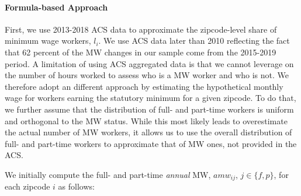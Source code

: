 
\paragraph{Formula-based Approach}
First, we use 2013-2018 ACS data to approximate the zipcode-level share of minimum wage 
workers, $l_{i}$. We use ACS data later than 2010 reflecting the fact that 62 percent of the 
MW changes in our sample come from the 2015-2019 period. A limitation of using ACS 
aggregated data is that we cannot leverage on the number of hours worked to assess who is a 
MW worker and who is not. We therefore adopt an different approach by estimating the hypothetical 
monthly wage for workers earning the statutory minimum for a given zipcode. To do that, 
we further assume that the distribution of full- and part-time workers is uniform and orthogonal 
to the MW status. While this most likely leads to overestimate the actual number of MW workers, 
it allows us to use the overall distribution of full- and part-time workers to 
approximate that of MW ones, not provided in the ACS. 

We initially compute the full- and part-time \textit{annual} MW, $amw_{ij}$, $j\in \{f, p\}$, 
for each zipcode $i$ as follows: 


